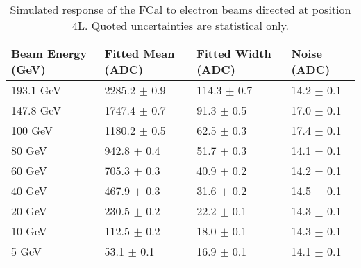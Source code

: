 \begin{table}[p]
\begin{center}
\begin{tabular}{|l|l|l|l|}
\hline
Beam Energy (GeV) & Fitted Mean (ADC)& Fitted Width (ADC)& Noise (ADC) \\
\hline
193.1 GeV  &  2285.2 $\pm$     0.9 &   114.3 $\pm$     0.7 &    14.2 $\pm$     0.1 \\
147.8 GeV  &  1747.4 $\pm$     0.7 &    91.3 $\pm$     0.5 &    17.0 $\pm$     0.1 \\
100 GeV  &  1180.2 $\pm$     0.5 &    62.5 $\pm$     0.3 &    17.4 $\pm$     0.1 \\
80 GeV  &   942.8 $\pm$     0.4 &    51.7 $\pm$     0.3 &    14.1 $\pm$     0.1 \\
60 GeV  &   705.3 $\pm$     0.3 &    40.9 $\pm$     0.2 &    14.2 $\pm$     0.1 \\
40 GeV  &   467.9 $\pm$     0.3 &    31.6 $\pm$     0.2 &    14.5 $\pm$     0.1 \\
20 GeV  &   230.5 $\pm$     0.2 &    22.2 $\pm$     0.1 &    14.3 $\pm$     0.1 \\
10 GeV  &   112.5 $\pm$     0.2 &    18.0 $\pm$     0.1 &    14.3 $\pm$     0.1 \\
5 GeV  &    53.1 $\pm$     0.1 &    16.9 $\pm$     0.1 &    14.1 $\pm$     0.1 \\
\hline
\end{tabular}
\end{center}
\caption{Simulated response of the FCal to electron beams directed at position 4L. Quoted uncertainties are statistical only.}
\label{TBres_table_elec_4LMC}
\end{table}









